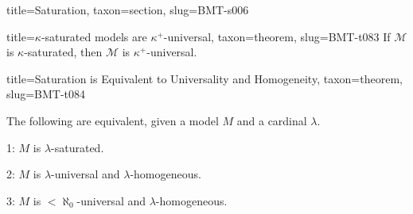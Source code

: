 \documentclass[a4paper]{article}
\begin{document}
\begin{tree}{title={Saturation}, taxon={section}, slug={BMT-s006}}
\begin{tree}{title={\(\kappa\)-saturated models are \(\kappa ^+\)-universal}, taxon={theorem}, slug={BMT-t083}}
If \(\mathcal {M}\) is \(\kappa\)-saturated, then \(\mathcal {M}\) is \(\kappa ^+\)-universal.
\end{tree}

\begin{tree}{title={Saturation is Equivalent to Universality and Homogeneity}, taxon={theorem}, slug={BMT-t084}}

    The following are equivalent, given a model \(M\) and a cardinal \(\lambda\).
\par{
    1: \(M\) is \(\lambda\)-saturated.
}\par{
    2: \(M\) is \(\lambda\)-universal and \(\lambda\)-homogeneous.
}\par{
    3: \(M\) is \(< \aleph _0\)-universal and \(\lambda\)-homogeneous.
}
\end{tree}

\end{tree}


  
  
\end{document}
